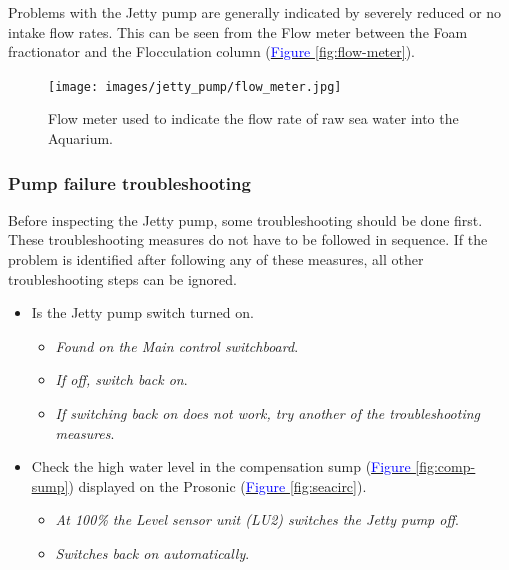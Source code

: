 \documentclass[
  12pt,
]{report}
\providecommand{\tightlist}{%
  \setlength{\itemsep}{0pt}\setlength{\parskip}{0pt}}\usepackage{longtable,booktabs,array}
\begin{document}
Problems with the Jetty pump are generally indicated by severely reduced
or no intake flow rates. This can be seen from the Flow meter between
the Foam fractionator and the Flocculation column
(\ul{\textcolor{blue}{Figure \ref{fig:flow-meter}}}).

\begin{figure}[H]

{\centering \texttt{[image: images/jetty\_pump/flow\_meter.jpg]}

}

\caption{Flow meter used to indicate the flow rate of raw sea water into
the Aquarium.}

\end{figure}

\hypertarget{pump-failure-troubleshooting}{%
\subsubsection{\texorpdfstring{Pump failure troubleshooting
\label{pump-shooting}}{Pump failure troubleshooting }}\label{pump-failure-troubleshooting}}

Before inspecting the Jetty pump, some troubleshooting should be done
first. These troubleshooting measures do not have to be followed in
sequence. If the problem is identified after following any of these
measures, all other troubleshooting steps can be ignored.

\begin{itemize}
\tightlist
\item
  Is the Jetty pump switch turned on.

  \begin{itemize}
  \tightlist
  \item
    \emph{Found on the Main control switchboard}.
  \item
    \emph{If off, switch back on}.
  \item
    \emph{If switching back on does not work, try another of the
    troubleshooting measures}.
  \end{itemize}
\item
  Check the high water level in the compensation sump
  (\ul{\textcolor{blue}{Figure \ref{fig:comp-sump}}}) displayed on the
  Prosonic (\ul{\textcolor{blue}{Figure \ref{fig:seacirc}}}).

  \begin{itemize}
  \tightlist
  \item
    \emph{At 100\% the Level sensor unit (LU2) switches the Jetty pump
    off}.
  \item
    \emph{Switches back on automatically}.
  \end{itemize}
\end{itemize}
\end{document}
